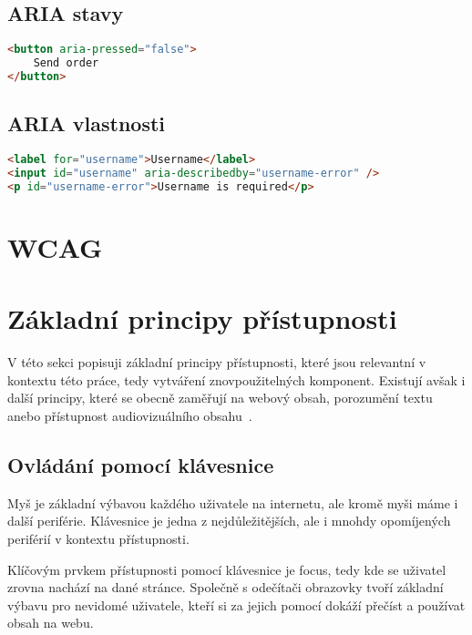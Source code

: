 \subsection{ARIA stavy}

\begin{lstlisting}[caption={Ukázka aria stavových attributů}, label={lst:example}, language=html, float=htb]
<button aria-pressed="false">
    Send order
</button>
\end{lstlisting}

\subsection{ARIA vlastnosti}

\begin{lstlisting}[caption={Ukázka aria vlastností}, label={lst:example}, language=html, float=htb]
<label for="username">Username</label>
<input id="username" aria-describedby="username-error" />
<p id="username-error">Username is required</p>
\end{lstlisting}

\section{WCAG}

\section{Základní principy přístupnosti}

V této sekci popisuji základní principy přístupnosti, které jsou relevantní v kontextu této práce, tedy vytváření znovpoužitelných komponent.
Existují avšak i další principy, které se obecně zaměřují na webový obsah, porozumění textu anebo přístupnost audiovizuálního obsahu~\cite{w3-accessibility-principles}.

\subsection{Ovládání pomocí klávesnice}

Myš je základní výbavou každého uživatele na internetu, ale kromě myši máme i další periférie.
Klávesnice je jedna z nejdůležitějších, ale i mnohdy opomíjených periférií v kontextu přístupnosti.


Klíčovým prvkem přístupnosti pomocí klávesnice je focus, tedy kde se uživatel zrovna nachází na dané stránce.
Společně s odečítači obrazovky tvoří základní výbavu pro nevidomé uživatele, kteří si za jejich pomocí dokáží přečíst a používat obsah na webu.

